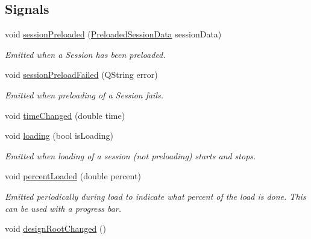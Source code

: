 \subsection*{Signals}
\begin{DoxyCompactItemize}
\item 
void \hyperlink{class_playback_controller_afaef47aaa0dabc82397754e7fddd51ba}{session\-Preloaded} (\hyperlink{struct_preloaded_session_data}{Preloaded\-Session\-Data} session\-Data)
\begin{DoxyCompactList}\small\item\em Emitted when a Session has been preloaded. \end{DoxyCompactList}\item 
\hypertarget{class_playback_controller_a9b5869752153c54552e48120fa18a1d2}{void \hyperlink{class_playback_controller_a9b5869752153c54552e48120fa18a1d2}{session\-Preload\-Failed} (Q\-String error)}\label{class_playback_controller_a9b5869752153c54552e48120fa18a1d2}

\begin{DoxyCompactList}\small\item\em Emitted when preloading of a Session fails. \end{DoxyCompactList}\item 
void \hyperlink{class_playback_controller_a7a43681bd09eb4b4e0f7c5581daafc15}{time\-Changed} (double time)
\item 
void \hyperlink{class_playback_controller_a8edabbfebbc16e2f840da4393505840b}{loading} (bool is\-Loading)
\begin{DoxyCompactList}\small\item\em Emitted when loading of a session (not preloading) starts and stops. \end{DoxyCompactList}\item 
\hypertarget{class_playback_controller_a41bd99c76cae9f2b74529f7a80387a74}{void \hyperlink{class_playback_controller_a41bd99c76cae9f2b74529f7a80387a74}{percent\-Loaded} (double percent)}\label{class_playback_controller_a41bd99c76cae9f2b74529f7a80387a74}

\begin{DoxyCompactList}\small\item\em Emitted periodically during load to indicate what percent of the load is done. This can be used with a progress bar. \end{DoxyCompactList}\item 
\hypertarget{class_playback_controller_a606e3c1cabad21cb0a0e61f1650804be}{void \hyperlink{class_playback_controller_a606e3c1cabad21cb0a0e61f1650804be}{design\-Root\-Changed} ()}\label{class_playback_controller_a606e3c1cabad21cb0a0e61f1650804be}


\end{DoxyCompactItemize}
